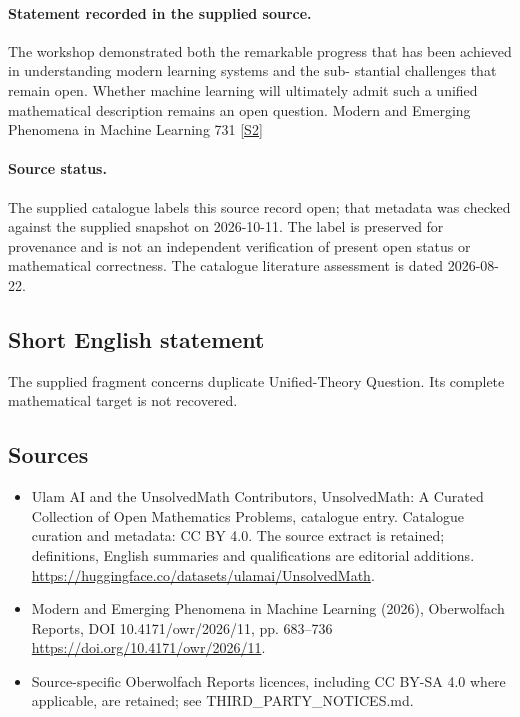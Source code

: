 \documentclass[11pt]{article}
\newcommand{\sref}[2]{\hyperlink{source:#1:#2}{[S#2]}}
\begin{document}
\paragraph{Statement recorded in the supplied source.}
The workshop demonstrated both the remarkable progress that has been achieved in understanding modern learning systems and the sub- stantial challenges that remain open. Whether machine learning will ultimately admit such a uniﬁed mathematical description remains an open question. Modern and Emerging Phenomena in Machine Learning 731 \sref{statement}{2}
\paragraph{Source status.}
The supplied catalogue labels this source record open; that metadata was checked against the supplied snapshot on 2026-10-11. The label is preserved for provenance and is not an independent verification of present open status or mathematical correctness. The catalogue literature assessment is dated 2026-08-22.
\subsection{Short English statement}
The supplied fragment concerns duplicate Unified-Theory Question. Its complete mathematical target is not recovered.
\subsection{Sources}
\begin{itemize}
\item[\hypertarget{source:statement:1}{S1}] Ulam AI and the UnsolvedMath Contributors, UnsolvedMath: A Curated Collection of Open Mathematics Problems, catalogue entry. Catalogue curation and metadata: CC BY 4.0. The source extract is retained; definitions, English summaries and qualifications are editorial additions.
\url{https://huggingface.co/datasets/ulamai/UnsolvedMath}.
\item[\hypertarget{source:statement:2}{S2}] Modern and Emerging Phenomena in Machine Learning (2026), Oberwolfach Reports, DOI 10.4171/owr/2026/11, pp. 683--736
\url{https://doi.org/10.4171/owr/2026/11}.
\item Source-specific Oberwolfach Reports licences, including CC BY-SA 4.0 where applicable, are retained; see THIRD\_PARTY\_NOTICES.md.
\end{itemize}
\end{document}
